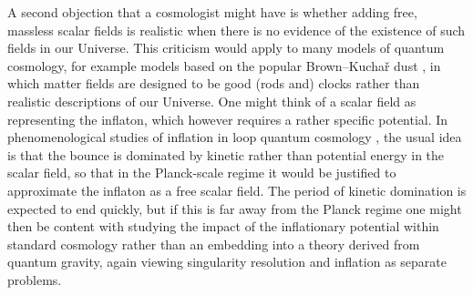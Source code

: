 \documentclass[aps,prd,11pt,showkeys,nofootinbib]{revtex4-2}
\begin{document}
A second objection that a cosmologist might have is whether adding free, massless scalar fields is realistic when there is no evidence of the existence of such fields in our Universe. This criticism would apply to many models of quantum cosmology, for example models based on the popular Brown--Kucha\v{r} dust \cite{Brown:1994py}, in which matter fields are designed to be good (rods and) clocks rather than realistic descriptions of our Universe. One might think of a scalar field as representing the inflaton, which however requires a rather specific potential. In phenomenological studies of inflation in loop quantum cosmology \cite{Agullo:2013ai}, the usual idea is that the bounce is dominated by kinetic rather than potential energy in the scalar field, so that in the Planck-scale regime it would be justified to approximate the inflaton as a free scalar field. The period of kinetic domination is expected to end quickly, but if this is far away from the Planck regime one might then be content with studying the impact of the inflationary potential within standard cosmology rather than an embedding into a theory derived from quantum gravity, again viewing singularity resolution and inflation as separate problems. 
\end{document}
